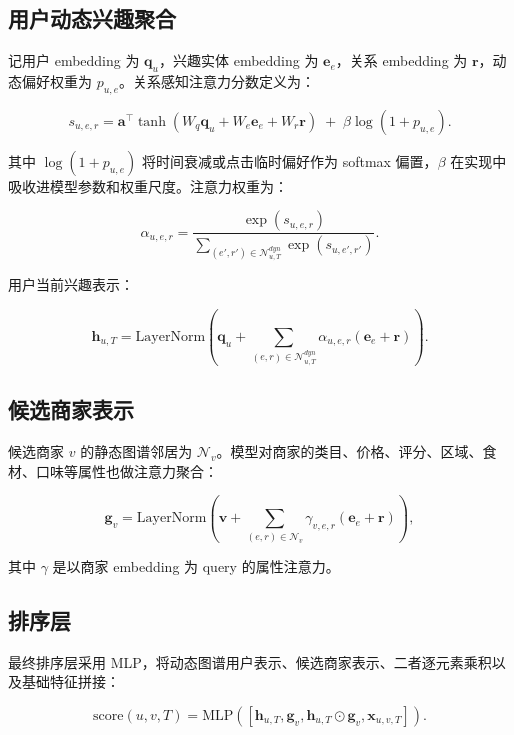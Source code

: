 \documentclass[UTF8,a4paper,12pt]{ctexart}
\begin{document}
\subsection{用户动态兴趣聚合}

记用户 embedding 为 $\mathbf{q}_u$，兴趣实体 embedding 为 $\mathbf{e}_e$，关系 embedding 为 $\mathbf{r}$，动态偏好权重为 $p_{u,e}$。关系感知注意力分数定义为：

\begin{equation}
s_{u,e,r}=
\mathbf{a}^{\top}\tanh(W_q\mathbf{q}_u+W_e\mathbf{e}_e+W_r\mathbf{r})
\;+\;\beta\log(1+p_{u,e}).
\end{equation}

其中 $\log(1+p_{u,e})$ 将时间衰减或点击临时偏好作为 softmax 偏置，$\beta$ 在实现中吸收进模型参数和权重尺度。注意力权重为：

\begin{equation}
\alpha_{u,e,r}=
\frac{\exp(s_{u,e,r})}{\sum_{(e',r')\in \mathcal{N}^{dyn}_{u,T}}\exp(s_{u,e',r'})}.
\end{equation}

用户当前兴趣表示：

\begin{equation}
\mathbf{h}_{u,T}=
\mathrm{LayerNorm}\left(
\mathbf{q}_u+\sum_{(e,r)\in \mathcal{N}^{dyn}_{u,T}}
\alpha_{u,e,r}(\mathbf{e}_e+\mathbf{r})
\right).
\end{equation}

\subsection{候选商家表示}

候选商家 $v$ 的静态图谱邻居为 $\mathcal{N}_v$。模型对商家的类目、价格、评分、区域、食材、口味等属性也做注意力聚合：

\begin{equation}
\mathbf{g}_v=\mathrm{LayerNorm}\left(
\mathbf{v}+\sum_{(e,r)\in \mathcal{N}_v}\gamma_{v,e,r}(\mathbf{e}_e+\mathbf{r})
\right),
\end{equation}

其中 $\gamma$ 是以商家 embedding 为 query 的属性注意力。

\subsection{排序层}

最终排序层采用 MLP，将动态图谱用户表示、候选商家表示、二者逐元素乘积以及基础特征拼接：

\begin{equation}
\mathrm{score}(u,v,T)=
\mathrm{MLP}([\mathbf{h}_{u,T},\mathbf{g}_v,\mathbf{h}_{u,T}\odot \mathbf{g}_v,\mathbf{x}_{u,v,T}]).
\end{equation}
\end{document}
